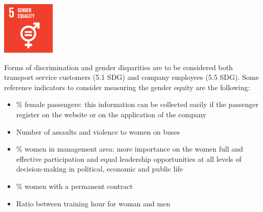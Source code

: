 \begin{minipage}[c]{0.2\textwidth}
    \includegraphics[width=\textwidth]{Images/Social_sustainability/5_gender.png}
\end{minipage}
\begin{minipage}[c]{0.8\textwidth}
Forms of discrimination and gender disparities are to be considered both transport service customers (5.1 SDG) and company employees (5.5 SDG). Some reference indicators to consider measuring the gender equity are the following:
\begin{itemize}
    \item \% female passengers: this information can be collected easily if the passenger register on the website or on the application of the company 
    \item Number of assaults and violence to women on buses
    \item \% women in management area: more importance on the women full and effective participation and equal leadership opportunities at all levels of decision-making in political, economic and public life
    \item \% women with a permanent contract 
    \item Ratio between training hour for woman and men
\end{itemize}
\end{minipage}
\hfill


